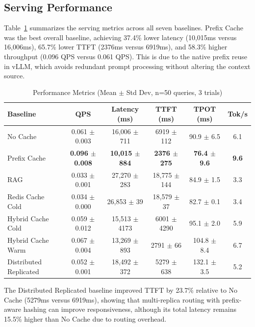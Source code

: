 \documentclass[12pt,a4paper]{article}
\begin{document}
\subsection{Serving Performance}

Table~\ref{tab:performance} summarizes the serving metrics across all seven baselines. Prefix Cache was the best overall baseline, achieving 37.4\% lower latency (10,015ms versus 16,006ms), 65.7\% lower TTFT (2376ms versus 6919ms), and 58.3\% higher throughput (0.096 QPS versus 0.061 QPS). This is due to the native prefix reuse in vLLM, which avoids redundant prompt processing without altering the context source.


\begin{table}[H]
\centering
\caption{Performance Metrics (Mean $\pm$ Std Dev, n=50 queries, 3 trials)}
\label{tab:performance}
\footnotesize
\begin{tabular}{@{}lccccc@{}}
\toprule
\textbf{Baseline} & \textbf{QPS} & \textbf{Latency (ms)} & \textbf{TTFT (ms)} & \textbf{TPOT (ms)} & \textbf{Tok/s} \\
\midrule
No Cache & 0.061 $\pm$ 0.003 & 16,006 $\pm$ 711 & 6919 $\pm$ 112 & 90.9 $\pm$ 6.5 & 6.1 \\
Prefix Cache & \textbf{0.096 $\pm$ 0.008} & \textbf{10,015 $\pm$ 884} & \textbf{2376 $\pm$ 275} & \textbf{76.4 $\pm$ 9.6} & \textbf{9.6} \\
RAG & 0.033 $\pm$ 0.001 & 27,270 $\pm$ 283 & 18,775 $\pm$ 144 & 84.9 $\pm$ 1.5 & 3.3 \\
Redis Cache Cold & 0.034 $\pm$ 0.000 & 26,853 $\pm$ 39 & 18,579 $\pm$ 37 & 82.7 $\pm$ 0.1 & 3.4 \\
Hybrid Cache Cold & 0.059 $\pm$ 0.012 & 15,513 $\pm$ 4173 & 6001 $\pm$ 4290 & 95.1 $\pm$ 2.0 & 5.9 \\
Hybrid Cache Warm & 0.067 $\pm$ 0.004 & 13,269 $\pm$ 893 & 2791 $\pm$ 66 & 104.8 $\pm$ 8.4 & 6.7 \\
Distributed Replicated & 0.052 $\pm$ 0.001 & 18,492 $\pm$ 372 & 5279 $\pm$ 638 & 132.1 $\pm$ 3.5 & 5.2 \\
\bottomrule
\end{tabular}
\end{table}

The Distributed Replicated baseline improved TTFT by 23.7\% relative to No Cache (5279ms versus 6919ms), showing that multi-replica routing with prefix-aware hashing can improve responsiveness, although its total latency remains 15.5\% higher than No Cache due to routing overhead.
\end{document}
